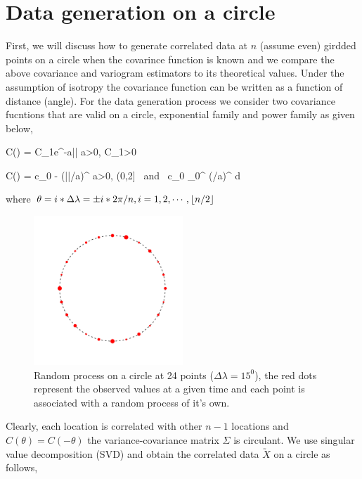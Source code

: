 \section{Data generation on a circle}



First, we will discuss how to generate correlated data at $n$ (assume even) girdded points on a circle when the covarince function is known and we compare the above covariance and variogram estimators to its theoretical values. Under the assumption of isotropy the covariance function can be written as a function of distance (angle). For the data generation process we consider two covariance fucntions that are valid on a circle, exponential family and power family as given below, 

\beq \label{exp_cov} 
C(\theta) = C_1e^{-a|\theta|} \quad a>0, C_1>0
\eeq

\beq \label{power_cov} 
C(\theta) = c_0 - (|\theta|/a)^{\alpha} \quad a>0, \alpha \in (0,2] \mbox{ and } c_0 \ge \int_0^\pi
			(\theta/a)^{\alpha} \sin \theta d \theta
\eeq


where $\theta = i*\Delta\lambda = \pm i*2\pi/n, i=1,2,\cdots,\lfloor{n/2}\rfloor$ \\

\begin{figure}[H]
	\centering
	\includegraphics[width=0.5\textwidth]{graphs/process_circle}
	\caption {Random process on a circle at 24 points ($\Delta\lambda = 15^0$), the red dots represent the  observed values at a given time and each point is associated with a random process of it's own.}
\end{figure}

Clearly, each location is correlated with other $n-1$ locations and $C(\theta) = C(-\theta)$ the variance-covariance matrix $\Sigma$ is circulant. We use singular value decomposition (SVD) and obtain the correlated data $\utilde{X}$ on a circle as follows, 

